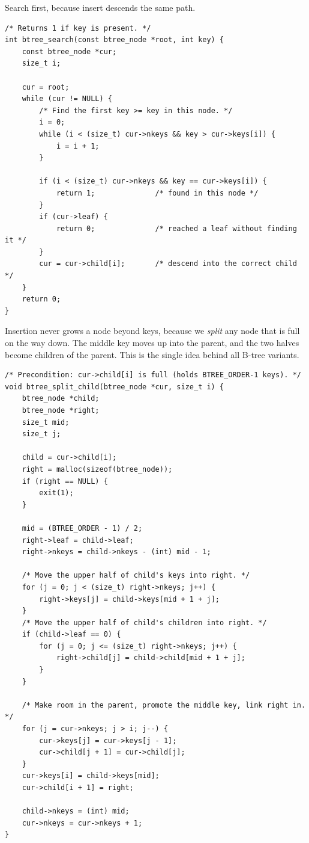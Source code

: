 Search first, because insert descends the same path.

\begin{lstlisting}[caption={Search a B-tree, one node visit per level.}]
/* Returns 1 if key is present. */
int btree_search(const btree_node *root, int key) {
    const btree_node *cur;
    size_t i;

    cur = root;
    while (cur != NULL) {
        /* Find the first key >= key in this node. */
        i = 0;
        while (i < (size_t) cur->nkeys && key > cur->keys[i]) {
            i = i + 1;
        }

        if (i < (size_t) cur->nkeys && key == cur->keys[i]) {
            return 1;              /* found in this node */
        }
        if (cur->leaf) {
            return 0;              /* reached a leaf without finding it */
        }
        cur = cur->child[i];       /* descend into the correct child */
    }
    return 0;
}
\end{lstlisting}

Insertion never grows a node beyond  keys, because we
\emph{split} any node that is full on the way down. The middle key
moves up into the parent, and the two halves become children of the
parent. This is the single idea behind all B-tree variants.

\begin{lstlisting}[caption={Split a full child of cur at child index i.}]
/* Precondition: cur->child[i] is full (holds BTREE_ORDER-1 keys). */
void btree_split_child(btree_node *cur, size_t i) {
    btree_node *child;
    btree_node *right;
    size_t mid;
    size_t j;

    child = cur->child[i];
    right = malloc(sizeof(btree_node));
    if (right == NULL) {
        exit(1);
    }

    mid = (BTREE_ORDER - 1) / 2;
    right->leaf = child->leaf;
    right->nkeys = child->nkeys - (int) mid - 1;

    /* Move the upper half of child's keys into right. */
    for (j = 0; j < (size_t) right->nkeys; j++) {
        right->keys[j] = child->keys[mid + 1 + j];
    }
    /* Move the upper half of child's children into right. */
    if (child->leaf == 0) {
        for (j = 0; j <= (size_t) right->nkeys; j++) {
            right->child[j] = child->child[mid + 1 + j];
        }
    }

    /* Make room in the parent, promote the middle key, link right in. */
    for (j = cur->nkeys; j > i; j--) {
        cur->keys[j] = cur->keys[j - 1];
        cur->child[j + 1] = cur->child[j];
    }
    cur->keys[i] = child->keys[mid];
    cur->child[i + 1] = right;

    child->nkeys = (int) mid;
    cur->nkeys = cur->nkeys + 1;
}
\end{lstlisting}

